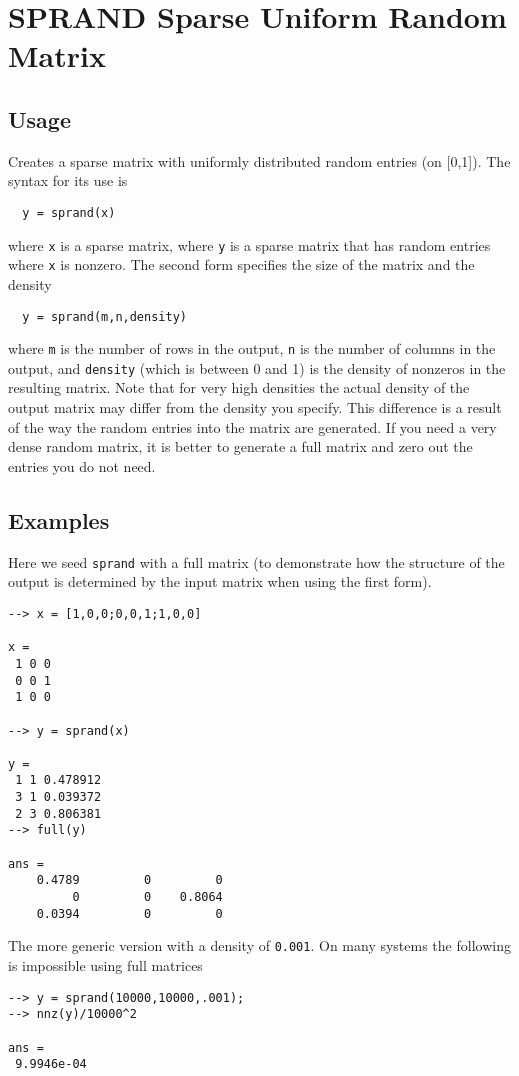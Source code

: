 \section{SPRAND Sparse Uniform Random Matrix}

\subsection{Usage}

Creates a sparse matrix with uniformly distributed random entries (on [0,1]).  The
syntax for its use is
\begin{verbatim}
  y = sprand(x)
\end{verbatim}
where \verb|x| is a sparse matrix, where \verb|y| is a sparse matrix that has
random entries where \verb|x| is nonzero.  The second form specifies the
size of the matrix and the density
\begin{verbatim}
  y = sprand(m,n,density)
\end{verbatim}
where \verb|m| is the number of rows in the output, \verb|n| is the number of 
columns in the output, and \verb|density| (which is between 0 and 1) is
the density of nonzeros in the resulting matrix.  Note that for very
high densities the actual density of the output matrix may differ from
the density you specify.  This difference is a result of the way the
random entries into the matrix are generated.  If you need a very dense
random matrix, it is better to generate a full matrix and zero out the 
entries you do not need.
\subsection{Examples}

Here we seed \verb|sprand| with a full matrix (to demonstrate how the structure
of the output is determined by the input matrix when using the first form).
\begin{verbatim}
--> x = [1,0,0;0,0,1;1,0,0]

x = 
 1 0 0 
 0 0 1 
 1 0 0 

--> y = sprand(x)

y = 
 1 1 0.478912
 3 1 0.039372
 2 3 0.806381
--> full(y)

ans = 
    0.4789         0         0 
         0         0    0.8064 
    0.0394         0         0 
\end{verbatim}
The more generic version with a density of \verb|0.001|.  On many systems the
following is impossible using full matrices
\begin{verbatim}
--> y = sprand(10000,10000,.001);
--> nnz(y)/10000^2

ans = 
 9.9946e-04 
\end{verbatim}
